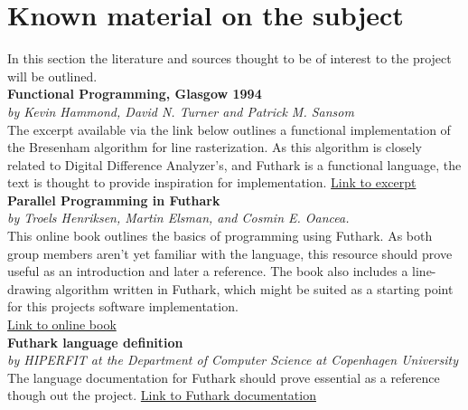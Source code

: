 \section{Known material on the subject}
In this section the literature and sources thought to be of interest to the project will be outlined.\\

\textbf{Functional Programming, Glasgow 1994}\\
\textit{by Kevin Hammond, David N. Turner and Patrick M. Sansom}\\
The excerpt available via the link below outlines a functional implementation of the Bresenham algorithm for line rasterization.
As this algorithm is closely related to Digital Difference Analyzer's, and Futhark is a functional language, the text is thought to provide inspiration for implementation. \href{https://books.google.dk/books?id=BmngBwAAQBAJ&pg=PA2&lpg=PA2&dq=bresenham%20line%20drawing%20algorithm%20functional%20programming&source=bl&ots=8UY9Iru3i8&sig=8gFpJZzpcDvXZiVBqTPXhKGsFDU&hl=en&sa=X&ved=0ahUKEwin0_Wp16DZAhXH6KQKHeoXAboQ6AEIMTAB#v=onepage&q=bresenham&f=false}{Link to excerpt}
\\

\textbf{Parallel Programming in Futhark}\\
\textit{by Troels Henriksen, Martin Elsman, and Cosmin E. Oancea.}\\
This online book outlines the basics of programming using Futhark. As both group members aren't yet familiar with the language, this resource should prove useful as an introduction and later a reference. The book also includes a line-drawing algorithm written in Futhark, which might be suited as a starting point for this projects software implementation.\\
\href{https://futhark-book.readthedocs.io/en/latest/}{Link to online book}
\\

\textbf{Futhark language definition}\\
\textit{by HIPERFIT at the Department of Computer Science at Copenhagen University}\\
The language documentation for Futhark should prove essential as a reference though out the project.
\href{https://futhark.readthedocs.io/en/latest/}{Link to Futhark documentation}\\

